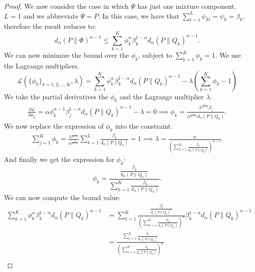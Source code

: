 \armonic*
\begin{proof}
We now consider the case in which $\Psi$ has just one mixture component, \ie $L = 1$ and we abbreviate $\Psi = P$. In this case, we have that $\sum_{l=1}^L \psi_{kl}= \psi_k = \beta_k$, therefore the result reduces to:
\begin{equation}
     d_{\alpha} (P \| \Phi)^{\alpha-1} \le  \sum_{k=1}^K \phi_{k}^\alpha \beta_{k}^{1-\alpha} d_{\alpha} (P \| Q_k)^{\alpha-1}.
\end{equation}
We can now minimize the bound over the $\phi_k$, subject to $\sum_{k=1}^K \phi_k = 1$. We use the Lagrange multipliers.
    \begin{equation*}
        \mathcal{L}(\{\phi_k\}_{k=1,2,...,K}, \lambda) = \sum_{k=1}^K \phi_{k}^\alpha \beta_{k}^{1-\alpha} d_{\alpha} (P \| Q_k)^{\alpha-1} - \lambda \left( \sum_{k=1}^K \phi_k -1 \right)
    \end{equation*}
    We take the partial derivatives \wrt the $\phi_k$ and the Lagrange multiplier $\lambda$.
    \begin{align*}
        \frac{\partial \mathcal{L}}{\partial \phi_k} = \alpha \phi_k^{\alpha-1} \beta_j^{1-\alpha} d_{\alpha}(P \| Q_k)^{\alpha-1} - \lambda = 0 \implies \phi_k = \frac{\lambda^{\frac{1}{\alpha-1}}  \beta_j}{\alpha^{\frac{1}{\alpha-1}} d_{\alpha}(P \| Q_k)}.
    \end{align*}
    We now replace the expression of $\phi_k$ into the constraint.
    \begin{align*}
        \sum_{j=1}^K \phi_k = \frac{\lambda^\frac{1}{\alpha-1}}{\alpha^\frac{1}{\alpha-1}}  \sum_{k=1}^L \frac{ \beta_k}{ d_{\alpha}(P \| Q_k)} = 1 \implies \lambda = \frac{\alpha}{\left( \sum_{k=1}^K \frac{ \beta_k}{ d_{\alpha}(P \| Q_k)}\right)^{{\alpha-1}}}.
    \end{align*}
    And finally we get the expression for $\phi_k$:
    \begin{equation}
        \phi_k = \frac{\frac{\beta_k}{d_{\alpha}(P \| Q_k)}} {\sum_{h=1}^K \frac{ \beta_h}{ d_{\alpha}(P \| Q_h)}}.
    \end{equation}
    We can now compute the bound value:
    \begin{align*}
        \sum_{k=1}^K \phi_{k}^\alpha \beta_{k}^{1-\alpha} d_{\alpha} (P \| Q_k)^{\alpha-1} & = \sum_{k=1}^K \frac{\frac{\beta_k^{\alpha}}{d_{\alpha}(P \| Q_k)^{\alpha}}} {\left(\sum_{h=1}^K \frac{ \beta_h}{ d_{\alpha}(P \| Q_h)}\right)^{\alpha}} \beta_{k}^{1-\alpha} d_{\alpha} (P \| Q_k)^{\alpha-1} \\
        & = \frac{ \sum_{k=1}^K \frac{\beta_k}{d_{\alpha}(P \| Q_k)} }{\left(\sum_{h=1}^K \frac{ \beta_h}{ d_{\alpha}(P \| Q_h)}\right)^{\alpha}} \\

\end{align*}
\end{proof}
